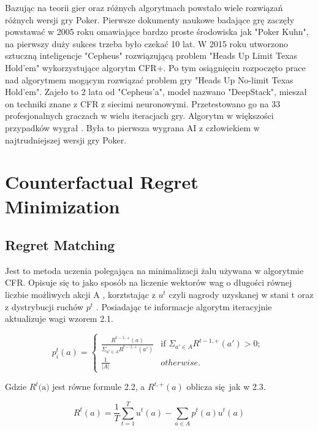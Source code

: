 \documentclass[12pt,oneside,a4paper]{report}
\begin{document}
Bazując na teorii gier oraz różnych algorytmach powstało wiele rozwiązań różnych wersji gry Poker.
Pierwsze dokumenty naukowe badające grę zaczęły powstawać w 2005 roku omawiające bardzo proste
środowiska jak "Poker Kuhn", na pierwszy duży sukces trzeba było czekać 10 lat.
W 2015 roku utworzono sztuczną inteligencje "Cepheus" rozwiązującą problem
"Heads Up Limit Texas Hold'em" wykorzystujące algorytm CFR+. Po tym osiągnięciu rozpoczęto prace nad
algorytmem mogącym rozwiązać problem gry "Heads Up No-limit Texas Hold'em". Zajeło to 2 lata od 
"Cepheus'a", model nazwano "DeepStack", mieszał on techniki znane z CFR z siecimi neuronowymi. 
Przetestowano go na 33 profesjonalnych graczach w wielu iteracjach gry. Algorytm w większości
przypadków wygrał \cite{ds}. Była to pierwsza wygrana AI z człowiekiem w najtrudniejszej wersji gry Poker.

\section{Counterfactual Regret Minimization}

\subsection{Regret Matching}

Jest to metoda uczenia polegająca na minimalizacji żalu używana w algorytmie CFR.
Opisuje się to jako sposób na liczenie wektorów wag o długości równej liczbie możliwych akcji A
, korztstając z $u^{t}$ czyli nagrody uzyskanej w stani t oraz z dystrybucji ruchów $p^{t}$ \cite{rmg}. 
Posiadając te informacje algorytm iteracyjnie aktualizuje wagi wzorem 2.1.


\begin{equation}
p^{t}_{i}\left( a \right) = \left\{ \begin{array}{ll}
      \frac{R^{t-1, \text{+}}\left(a\right)}{ \Sigma_{a' \in A} R^{t-1,\text{+}}\left(a'\right)} &
      \mbox{if $\Sigma_{a' \in A} R^{t-1,\text{+}}\left(a'\right) >
      0$};\\
      \frac{1}{|A|} & \mbox{$otherwise$}.\end{array} \right. \ 
\end{equation}

Gdzie $R^{t} \text{(a)}$ jest równe formule 2.2, a $R^{t,\text{+}}(a)$ oblicza się jak w 2.3.

\begin{equation}
   R^{t} (a) = \frac{1}{T} {\sum_{t=1}^{T} u^{t} (a)} - \sum_{a \in A} p^{t} (a) u^{t} (a)
\end{equation}
\end{document}

